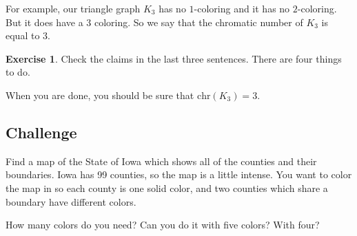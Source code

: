 \documentclass[12pt,letterpaper]{article}
\theoremstyle{definition}
\newtheorem{exercise}[question]{Exercise}
\begin{document}
For example, our triangle graph $K_3$ has no $1$-coloring and it has no $2$-coloring. But it does have a $3$ coloring. So we say that the chromatic number of $K_3$ is equal to $3$.

\begin{exercise}
Check the claims in the last three sentences. There are four things to do.

When you are done, you should be sure that $\mathrm{chr}(K_3) = 3$.
\end{exercise}


\subsection*{Challenge}

Find a map of the State of Iowa which shows all of the counties and their boundaries. Iowa has 99 counties, so the 
map is a little intense. You want to color the map in so each county is one solid color, and two counties
which share a boundary have different colors.

How many colors do you need? Can you do it with five colors? With four?



\end{document}
